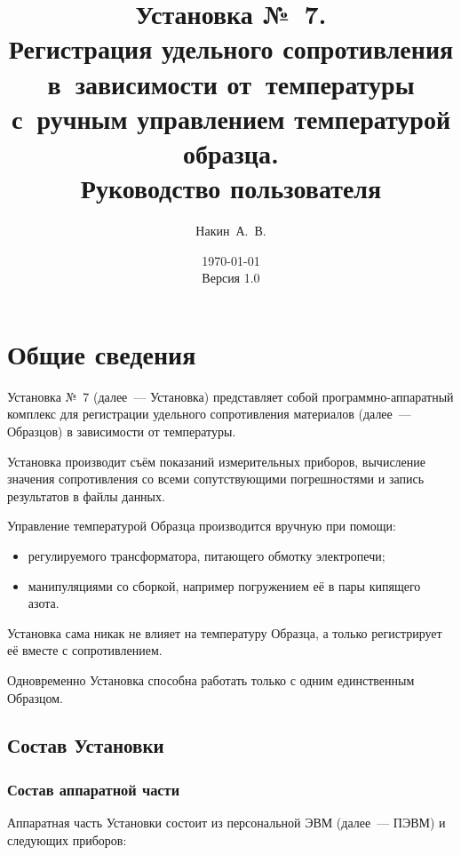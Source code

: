 \documentclass[12pt, a4paper, twocolumn]{report}
\title{Установка №~7. \\ Регистрация удельного сопротивления в~зависимости от~температуры с~ручным управлением температурой образца. \\ Руководство пользователя}
\author{Накин~А.~В.}
\date{\today\\Версия 1.0}
\begin{document}
\maketitle

\tableofcontents

\chapter{Общие сведения}

Установка №~7 (далее~--- Установка) представляет собой программно-аппаратный комплекс для регистрации удельного сопротивления материалов (далее~--- Образцов) в зависимости от температуры.

Установка производит съём показаний измерительных приборов, вычисление значения сопротивления со всеми сопутствующими погрешностями и запись результатов в файлы данных.

Управление температурой Образца производится вручную при помощи:

\begin{itemize}
\item регулируемого трансформатора, питающего обмотку электропечи;
\item манипуляциями со сборкой, например погружением её в пары кипящего азота.
\end{itemize}

Установка сама никак не влияет на температуру Образца, а только регистрирует её вместе с сопротивлением.

Одновременно Установка способна работать только с одним единственным Образцом.

\section{Состав Установки}

\subsection{Состав аппаратной части}

Аппаратная часть Установки состоит из персональной ЭВМ (далее~--- ПЭВМ) и следующих приборов:
\end{document}
